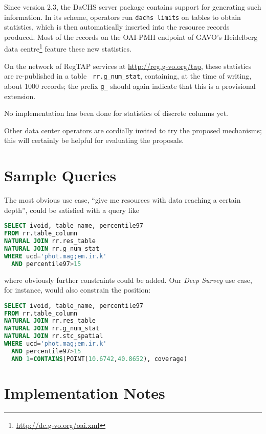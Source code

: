 \documentclass[11pt,a4paper]{ivoa}
\newcommand{\rtent}[1]{\texttt{\color{rtcolor} #1}}
\begin{document}
Since version 2.3, the DaCHS server package contains support for
generating such information. In its scheme, operators run 
\verb|dachs limits| 
on tables to obtain statistics, which is then automatically
inserted into the resource records produced.  Most of the records on
the OAI-PMH endpoint of GAVO's Heidelberg data
centre\footnote{\url{http://dc.g-vo.org/oai.xml}} feature these new
statistics.

On the network of RegTAP services at \url{http://reg.g-vo.org/tap},
these
statistics are re-published in a table \rtent{rr.g\_num\_stat},
containing, at the time of writing, about 1000 records; the prefix
\verb|g_| should again indicate that this is a provisional extension.

No implementation has been done for statistics of discrete
columns yet.

Other data center operators are cordially invited to try the proposed
mechanisms; this will certainly be helpful for evaluating the proposals.


\section{Sample Queries}

The most obvious use case, ``give me resources with data reaching a
certain depth'', could be satisfied with a query like

\begin{lstlisting}[language=SQL]
SELECT ivoid, table_name, percentile97
FROM rr.table_column
NATURAL JOIN rr.res_table
NATURAL JOIN rr.g_num_stat
WHERE ucd='phot.mag;em.ir.k'
  AND percentile97>15
\end{lstlisting}

where obviously further constraints could be added.  Our \emph{Deep
Survey} use case, for instance, would also constrain the position:

\begin{lstlisting}[language=SQL]
SELECT ivoid, table_name, percentile97
FROM rr.table_column
NATURAL JOIN rr.res_table
NATURAL JOIN rr.g_num_stat
NATURAL JOIN rr.stc_spatial
WHERE ucd='phot.mag;em.ir.k'
  AND percentile97>15
  AND 1=CONTAINS(POINT(10.6742,40.8652), coverage)
\end{lstlisting}

\section{Implementation Notes}
\end{document}
